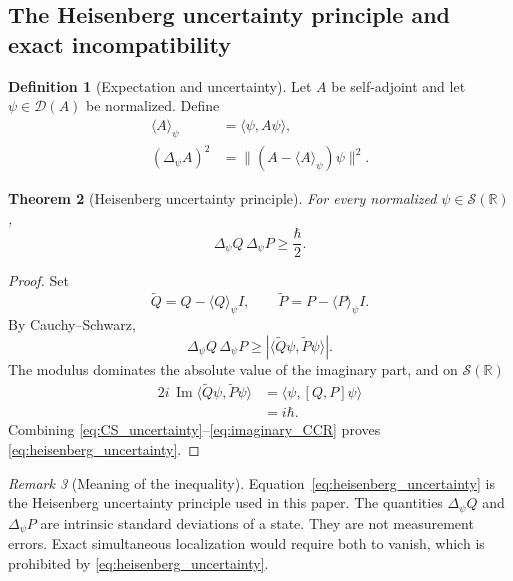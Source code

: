 \documentclass[11pt]{amsart}
\numberwithin{equation}{section}
\theoremstyle{plain}
\newtheorem{theorem}{Theorem}[section]
\theoremstyle{definition}
\newtheorem{definition}[theorem]{Definition}
\theoremstyle{remark}
\newtheorem{remark}[theorem]{Remark}
\newcommand{\R}{\mathbb{R}}
\newcommand{\Sch}{\mathcal{S}}
\newcommand{\Dom}{\mathcal{D}}
\begin{document}
\subsection{The Heisenberg uncertainty principle and exact incompatibility}
\label{subsec:heisenberg_uncertainty}

\begin{definition}[Expectation and uncertainty]
\label{def:uncertainty}
Let \(A\) be self-adjoint and let \(\psi\in\Dom(A)\) be normalized.  Define
\begin{align}
\langle A\rangle_\psi
&=\langle\psi,A\psi\rangle,
\label{eq:expectation_definition}\\
(\Delta_\psi A)^2
&=\|(A-\langle A\rangle_\psi)\psi\|^2.
\label{eq:variance_definition}
\end{align}
\end{definition}

\begin{theorem}[Heisenberg uncertainty principle]
\label{thm:heisenberg_uncertainty}
For every normalized \(\psi\in\Sch(\R)\),
\begin{equation}
\boxed{
\Delta_\psi Q\,\Delta_\psi P
\ge
\frac{\hbar}{2}.}
\label{eq:heisenberg_uncertainty}
\end{equation}
\end{theorem}

\begin{proof}
Set
\begin{equation}
\widetilde Q=Q-\langle Q\rangle_\psi I,
\qquad
\widetilde P=P-\langle P\rangle_\psi I.
\label{eq:centered_QP}
\end{equation}
By Cauchy--Schwarz,
\begin{equation}
\Delta_\psi Q\,\Delta_\psi P
\ge
\left|\langle\widetilde Q\psi,\widetilde P\psi\rangle\right|.
\label{eq:CS_uncertainty}
\end{equation}
The modulus dominates the absolute value of the imaginary part, and on
\(\Sch(\R)\)
\begin{align}
2i\,\operatorname{Im}
\langle\widetilde Q\psi,\widetilde P\psi\rangle
&=
\langle\psi,[Q,P]\psi\rangle
\label{eq:imaginary_commutator}\\
&=i\hbar.
\label{eq:imaginary_CCR}
\end{align}
Combining \eqref{eq:CS_uncertainty}--\eqref{eq:imaginary_CCR} proves
\eqref{eq:heisenberg_uncertainty}.
\end{proof}

\begin{remark}[Meaning of the inequality]
\label{rem:uncertainty_meaning}
Equation~\eqref{eq:heisenberg_uncertainty} is the Heisenberg uncertainty
principle used in this paper.  The quantities \(\Delta_\psi Q\) and
\(\Delta_\psi P\) are intrinsic standard deviations of a state.  They are
not measurement errors.  Exact simultaneous localization would require both
to vanish, which is prohibited by \eqref{eq:heisenberg_uncertainty}.
\end{remark}
\end{document}
